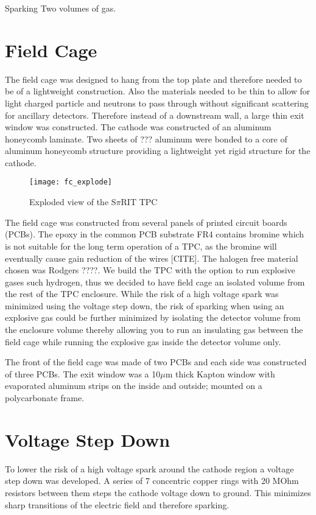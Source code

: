 Sparking
Two volumes of gas. 

\section{Field Cage}

The field cage was designed to hang from the top plate and therefore needed to be of a lightweight construction. Also the materials needed to be thin to allow for light charged particle and neutrons to pass through without significant scattering for ancillary detectors. Therefore instead of a downstream wall, a large thin exit window was constructed. The cathode was constructed of an aluminum honeycomb laminate. Two sheets of ??? aluminum were bonded to a core of aluminum honeycomb structure providing a lightweight yet rigid structure for the cathode. 

\begin{figure}[H]
\texttt{[image: fc\_explode]}
\caption{Exploded view of the S$\pi$RIT TPC}
\label{fig:fc_explode}
\end{figure}

The field cage was constructed from several panels of printed circuit boards (PCBs). The epoxy in the common PCB substrate FR4 contains bromine which is not suitable for the long term operation of a TPC, as the bromine will eventually cause gain reduction of the wires [CITE]. The halogen free material chosen was Rodgers ????. We build the TPC with the option to run explosive gases such  hydrogen, thus we decided to have field cage an isolated volume from the rest of the TPC enclosure. While the risk of a high voltage spark was minimized using the voltage step down, the risk of sparking when using an explosive gas could be further minimized by isolating the detector volume from the enclosure volume thereby allowing you to run an insulating gas between the field cage while running the explosive gas inside the detector volume only.  

The front of the field cage was made of two PCBs and each side was constructed of three PCBs. The exit window was a 10$\mu$m thick Kapton window with evaporated aluminum strips on the inside and outside; mounted on a polycarbonate frame.

\section{Voltage Step Down}

To lower the risk of a high voltage spark around the cathode region a voltage step down was developed. A series of 7 concentric copper rings with 20 MOhm resistors between them steps the cathode voltage down to ground. This minimizes sharp transitions of the electric field and therefore sparking. 

